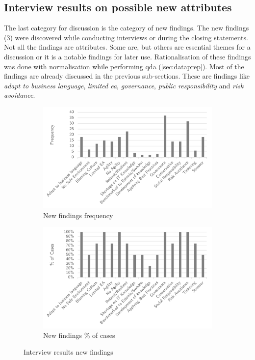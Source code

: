 \subsection{Interview results on possible new attributes}
\label{sub:interviewresultsnewattributes}
The last category for discussion is the category of new findings. The new findings (\cref{fig:interviewresultsfindings}) were discovered while conducting interviews or during the closing statements. Not all the findings are \glspl{attribute}. Some are, but others are essential themes for a discussion or it is a notable findings for later use. Rationalisation of these findings was done with normalisation while performing \acrshort{qda} (\cref{sec:dataprep}). Most of the findings are already discussed in the previous sub-sections. These are findings like \textit{adapt to business language}, \textit{limited \acrshort{ea}}, \textit{governance}, \textit{public responsibility} and \textit{risk avoidance}. 
\begin{figure}[H]
	\centering
	\begin{subfigure}[H]{0.5\textwidth}
		\centering
		\includegraphics[width=0.95\linewidth]{images/findings_frequency}
		\caption{New findings frequency}
		\label{fig:findingsfrequency}
	\end{subfigure}%
	\begin{subfigure}[H]{0.5\textwidth}
		\centering
		\includegraphics[width=0.95\linewidth]{images/findings_cases}
		\caption{New findings \% of cases}
		\label{fig:findingscases}
	\end{subfigure}
	\caption{Interview results new findings}
	\label{fig:interviewresultsfindings}
\end{figure}
